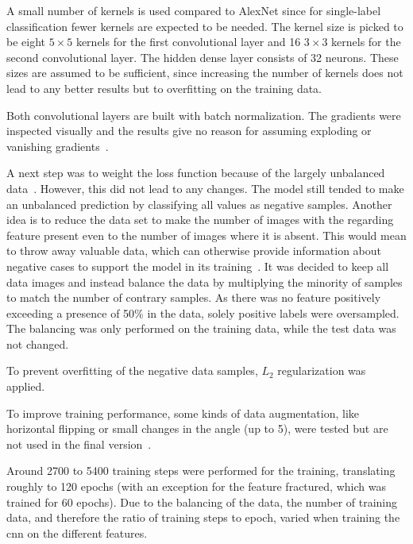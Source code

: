 A small number of kernels is used compared to AlexNet since for single-label classification fewer kernels are expected to be needed. The kernel size is picked to be eight $5\times5$ kernels for the first convolutional layer and 16 $3\times3$ kernels for the second convolutional layer. The hidden dense layer consists of 32 neurons. These sizes are assumed to be sufficient, since increasing the number of kernels does not lead to any better results but to overfitting on the training data.
 
Both convolutional layers are built with batch normalization. The gradients were inspected visually and the results give no reason for assuming exploding or vanishing gradients~\citep{pascanu2012understanding}.
 
A next step was to weight the loss function because of the largely unbalanced data~\citep{he2009learning,batista2004study}. However, this did not lead to any changes. The model still tended to make an unbalanced prediction by classifying all values as negative samples. Another idea is to reduce the data set to make the number of images with the regarding feature present even to the number of images where it is absent. This would mean to throw away valuable data, which can otherwise provide information about negative cases to support the model in its training~\citep{batista2004study}. It was decided to keep all data images and instead balance the data by multiplying the minority of samples to match the number of contrary samples. As there was no feature positively exceeding a presence of 50\% in the data, solely positive labels were oversampled. The balancing was only performed on the training data, while the test data was not changed.
 
To prevent overfitting of the negative data samples, \(L_2\) regularization was applied.
 
To improve training performance, some kinds of data augmentation, like horizontal flipping or small changes in the angle (up to 5\textdegree ), were tested but are not used in the final version~\citep{brownlee2019augmentation}.

\bigskip
Around 2700 to 5400 training steps were performed for the training, translating roughly to 120 epochs (with an exception for the feature fractured, which was trained for 60 epochs). Due to the balancing of the data, the number of training data, and therefore the ratio of training steps to epoch, varied when training the \acrshort{cnn} on the different features.

